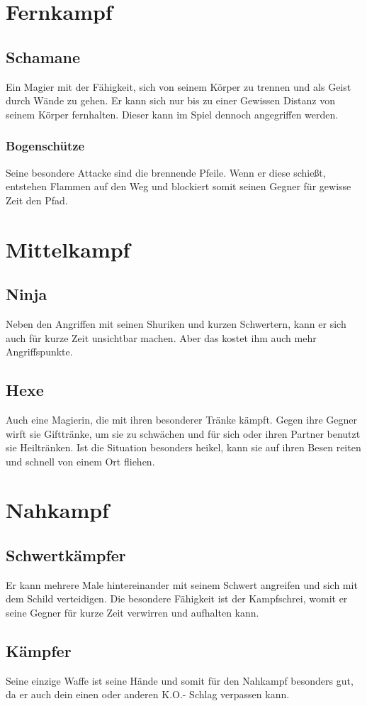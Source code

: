 \documentclass[10pt]{book}
\begin{document}
	\section{Fernkampf}
	\subsection{Schamane}
	Ein Magier mit der Fähigkeit, sich von seinem Körper zu trennen und als Geist durch Wände zu gehen. Er kann sich nur bis zu einer Gewissen Distanz von seinem Körper fernhalten. Dieser kann im Spiel dennoch angegriffen werden.
	\subsubsection{Bogenschütze}
	Seine besondere Attacke sind die brennende Pfeile. Wenn er diese schießt, entstehen Flammen auf den Weg und blockiert somit seinen Gegner für gewisse Zeit den Pfad.
	\section{Mittelkampf}
	\subsection{Ninja}
	Neben den Angriffen mit seinen Shuriken und kurzen Schwertern, kann er sich auch für kurze Zeit unsichtbar machen. Aber das kostet ihm auch mehr Angriffspunkte.
	\subsection{Hexe}
	Auch eine Magierin, die mit ihren besonderer Tränke kämpft. Gegen ihre Gegner wirft sie Gifttränke, um sie zu schwächen und für sich oder ihren Partner benutzt sie Heiltränken. Ist die Situation besonders heikel, kann sie auf ihren Besen reiten und schnell von einem Ort fliehen.
	\section{Nahkampf}
	\subsection{Schwertkämpfer}
	Er kann mehrere Male hintereinander mit seinem Schwert angreifen und sich mit dem Schild verteidigen. Die besondere Fähigkeit ist der Kampfschrei, womit er seine Gegner für kurze Zeit verwirren und aufhalten kann.
	\subsection{Kämpfer}
	Seine einzige Waffe ist seine Hände und somit für den Nahkampf besonders gut, da er auch dein einen oder anderen K.O.- Schlag verpassen kann.
\end{document}
